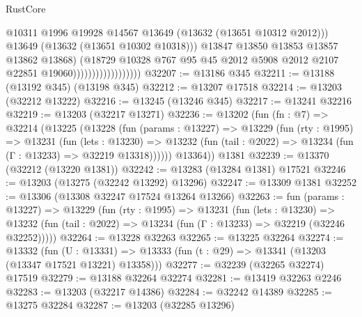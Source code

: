 \begin{lexlean}{RustCore}
\begin{coremodule}
                                            @10311
                                            @1996
                                            @19928
                                            @14567
                                            @13649
                                            (@13632 (@13651 @10312 @2012)))
                                          @13649
                                          (@13632 (@13651 @10302 @10318)))
                                        @13847
                                        @13850
                                        @13853
                                        @13857
                                        @13862
                                        @13868)
                                      (@18729
                                        @10328
                                        @767
                                        @95
                                        @45
                                        @2012
                                        @5908
                                        @2012
                                        @2107
                                        @22851
                                        @19060))))))))))))))))))
@32207 := @13186 @345
@32211 := @13188 (@13192 @345) (@13198 @345)
@32212 := @13207 @17518
@32214 := @13203 (@32212 @13222)
@32216 := @13245 (@13246 @345)
@32217 := @13241 @32216
@32219 := @13203 (@32217 @13271)
@32236 := @13202
    (fun (fn : @7) =>
    @32214
      (@13225
        (@13228
          (fun (params : @13227) =>
          @13229
            (fun (rty : @1995) =>
            @13231
              (fun (lets : @13230) =>
              @13232 (fun (tail : @2022) => @13234 (fun (Γ : @13233) => @32219 @13318))))))
        @13364))
    @1381
@32239 := @13370 (@32212 (@13220 @1381))
@32242 := @13283 (@13284 @1381) @17521
@32246 := @13203 (@13275 (@32242 @13292) @13296)
@32247 := @13309 @1381
@32252 := @13306 (@13308 @32247 @17524 @13264 @13266)
@32263 := fun (params : @13227) =>
  @13229
    (fun (rty : @1995) =>
    @13231
      (fun (lets : @13230) =>
      @13232 (fun (tail : @2022) => @13234 (fun (Γ : @13233) => @32219 (@32246 @32252)))))
@32264 := @13228 @32263
@32265 := @13225 @32264
@32274 := @13332
    (fun (U : @13331) => @13333 (fun (t : @29) => @13341 (@13203 (@13347 @17521 @13221) @13358)))
@32277 := @32239 (@32265 @32274) @17519
@32279 := @13188 @32264 @32274
@32281 := @13419 @32263 @2246
@32283 := @13203 (@32217 @14386)
@32284 := @32242 @14389
@32285 := @13275 @32284
@32287 := @13203 (@32285 @13296)

\end{coremodule}
\end{lexlean}
